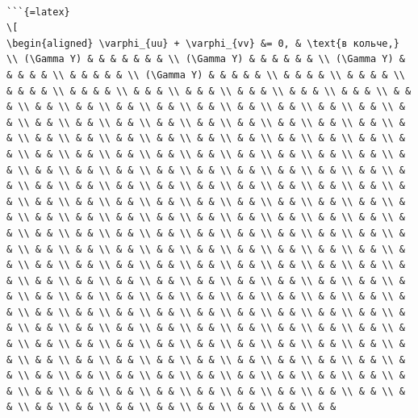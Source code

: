 \documentclass[
]{article}
\begin{document}
\begin{verbatim}

```{=latex}
\[
\begin{aligned} \varphi_{uu} + \varphi_{vv} &= 0, & \text{в кольче,} \\ (\Gamma Y) & & & & & & & \\ (\Gamma Y) & & & & & & \\ (\Gamma Y) & & & & & \\ & & & & & \\ (\Gamma Y) & & & & & \\ & & & & \\ & & & & \\ & & & & \\ & & & & \\ & & & \\ & & & \\ & & & \\ & & & \\ & & & \\ & & & \\ & & \\ & & \\ & & \\ & & \\ & & \\ & & \\ & & \\ & & \\ & & \\ & & \\ & & \\ & & \\ & & \\ & & \\ & & \\ & & \\ & & \\ & & \\ & & \\ & & \\ & & \\ & & \\ & & \\ & & \\ & & \\ & & \\ & & \\ & & \\ & & \\ & & \\ & & \\ & & \\ & & \\ & & \\ & & \\ & & \\ & & \\ & & \\ & & \\ & & \\ & & \\ & & \\ & & \\ & & \\ & & \\ & & \\ & & \\ & & \\ & & \\ & & \\ & & \\ & & \\ & & \\ & & \\ & & \\ & & \\ & & \\ & & \\ & & \\ & & \\ & & \\ & & \\ & & \\ & & \\ & & \\ & & \\ & & \\ & & \\ & & \\ & & \\ & & \\ & & \\ & & \\ & & \\ & & \\ & & \\ & & \\ & & \\ & & \\ & & \\ & & \\ & & \\ & & \\ & & \\ & & \\ & & \\ & & \\ & & \\ & & \\ & & \\ & & \\ & & \\ & & \\ & & \\ & & \\ & & \\ & & \\ & & \\ & & \\ & & \\ & & \\ & & \\ & & \\ & & \\ & & \\ & & \\ & & \\ & & \\ & & \\ & & \\ & & \\ & & \\ & & \\ & & \\ & & \\ & & \\ & & \\ & & \\ & & \\ & & \\ & & \\ & & \\ & & \\ & & \\ & & \\ & & \\ & & \\ & & \\ & & \\ & & \\ & & \\ & & \\ & & \\ & & \\ & & \\ & & \\ & & \\ & & \\ & & \\ & & \\ & & \\ & & \\ & & \\ & & \\ & & \\ & & \\ & & \\ & & \\ & & \\ & & \\ & & \\ & & \\ & & \\ & & \\ & & \\ & & \\ & & \\ & & \\ & & \\ & & \\ & & \\ & & \\ & & \\ & & \\ & & \\ & & \\ & & \\ & & \\ & & \\ & & \\ & & \\ & & \\ & & \\ & & \\ & & \\ & & \\ & & \\ & & \\ & & \\ & & \\ & & \\ & & \\ & & \\ & & \\ & & \\ & & \\ & & \\ & & \\ & & \\ & & \\ & & \\ & & \\ & & \\ & & \\ & & \\ & & \\ & & \\ & &
\end{verbatim}
\end{document}
